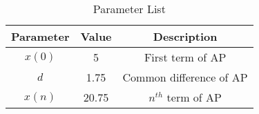 \begin{table}[ht]
    \centering
    \begin{tabular}{|c|c|c|}
        \hline
        Parameter & Value & Description \\
        \hline
        $x(0)$ & 5 & First term of AP \\
        $d$ & 1.75 & Common difference of AP \\
        $x(n)$ & 20.75 & $n^{th}$ term of AP \\
        \hline
    \end{tabular}
    \vspace{2mm}
    \caption{Parameter List}
    \label{tab:simple}
\end{table}
